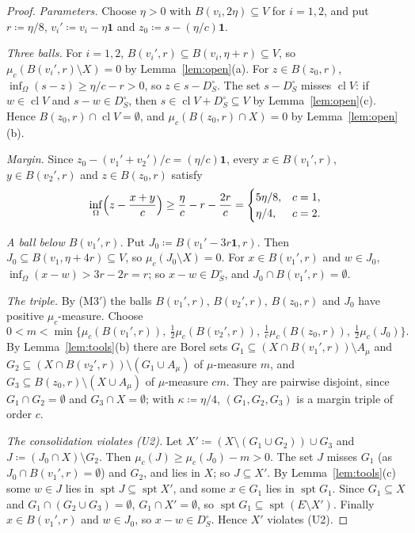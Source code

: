 \documentclass[11pt]{article}
\newcommand{\one}{\mathbf{1}}
\DeclareMathOperator{\cl}{cl}
\DeclareMathOperator{\spt}{spt}
\theoremstyle{plain}
\theoremstyle{definition}
\begin{document}
\begin{proof}
\emph{Parameters.} Choose $\eta>0$ with $B(v_i,2\eta)\subseteq V$ for $i=1,2$, and put
$r\coloneqq\eta/8$, $v_i'\coloneqq v_i-\eta\one$ and $z_0\coloneqq s-(\eta/c)\one$.

\emph{Three balls.} For $i=1,2$, $B(v_i',r)\subseteq B(v_i,\eta+r)\subseteq V$, so
$\mu_c(B(v_i',r)\setminus X)=0$ by Lemma~\ref{lem:open}(a). For $z\in B(z_0,r)$,
$\inf_\Omega(s-z)\ge\eta/c-r>0$, so $z\in s-D_S^\circ$. The set $s-D_S^\circ$ misses $\cl V$: if $w\in\cl V$
and $s-w\in D_S^\circ$, then $s\in\cl V+D_S^\circ\subseteq V$ by Lemma~\ref{lem:open}(c). Hence
$B(z_0,r)\cap\cl V=\emptyset$, and $\mu_c(B(z_0,r)\cap X)=0$ by Lemma~\ref{lem:open}(b).

\emph{Margin.} Since $z_0-(v_1'+v_2')/c=(\eta/c)\one$, every $x\in B(v_1',r)$, $y\in
B(v_2',r)$ and $z\in B(z_0,r)$ satisfy
\[
  \inf_\Omega\Bigl(z-\frac{x+y}c\Bigr)\ge\frac\eta c-r-\frac{2r}c=
  \begin{cases}5\eta/8,&c=1,\\ \eta/4,&c=2.\end{cases}
\]

\emph{A ball below $B(v_1',r)$.} Put $J_0\coloneqq B(v_1'-3r\one,r)$. Then $J_0\subseteq
B(v_1,\eta+4r)\subseteq V$, so $\mu_c(J_0\setminus X)=0$. For $x\in B(v_1',r)$ and $w\in J_0$,
$\inf_\Omega(x-w)>3r-2r=r$; so $x-w\in D_S^\circ$, and $J_0\cap B(v_1',r)=\emptyset$.

\emph{The triple.} By (M3$'$) the balls $B(v_1',r)$, $B(v_2',r)$, $B(z_0,r)$ and $J_0$ have
positive $\mu_c$-measure. Choose
\[
  0<m<\min\bigl\{\mu_c(B(v_1',r)),\ \tfrac12\mu_c(B(v_2',r)),\ \tfrac1c\mu_c(B(z_0,r)),\
  \tfrac12\mu_c(J_0)\bigr\}.
\]
By Lemma~\ref{lem:tools}(b) there are Borel sets $G_1\subseteq(X\cap B(v_1',r))\setminus
A_\mu$ and $G_2\subseteq(X\cap B(v_2',r))\setminus(G_1\cup A_\mu)$ of $\mu$-measure $m$, and
$G_3\subseteq B(z_0,r)\setminus(X\cup A_\mu)$ of $\mu$-measure $cm$. They are pairwise disjoint,
since $G_1\cap G_2=\emptyset$ and $G_3\cap X=\emptyset$; with $\kappa\coloneqq\eta/4$,
$(G_1,G_2,G_3)$ is a margin triple of order $c$.

\emph{The consolidation violates (U2).} Let $X'\coloneqq(X\setminus(G_1\cup G_2))\cup G_3$ and
$J\coloneqq(J_0\cap X)\setminus G_2$. Then $\mu_c(J)\ge\mu_c(J_0)-m>0$. The set $J$ misses $G_1$
(as $J_0\cap B(v_1',r)=\emptyset$) and $G_2$, and lies in $X$; so $J\subseteq X'$. By
Lemma~\ref{lem:tools}(c) some $w\in J$ lies in $\spt J\subseteq\spt X'$, and some $x\in G_1$
lies in $\spt G_1$. Since $G_1\subseteq X$ and $G_1\cap(G_2\cup G_3)=\emptyset$, $G_1\cap
X'=\emptyset$, so $\spt G_1\subseteq\spt(E\setminus X')$. Finally $x\in B(v_1',r)$ and $w\in
J_0$, so $x-w\in D_S^\circ$. Hence $X'$ violates (U2).
\end{proof}
\end{document}
